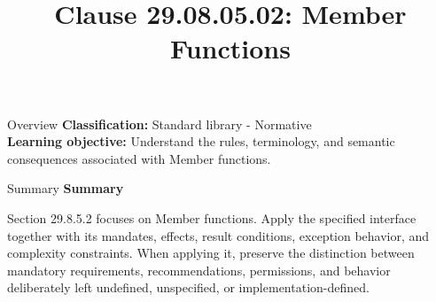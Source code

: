 \documentclass[10pt,letterpaper]{article}
\title{Clause 29.08.05.02: Member Functions}
\author{}
\date{}
\begin{document}
\maketitle
\begin{CornellOverviewBox}{Overview}
\textbf{Classification:} Standard library - Normative\\[2pt]
\textbf{Learning objective:} Understand the rules, terminology, and semantic consequences associated with Member functions.
\end{CornellOverviewBox}\begin{CornellSummaryBox}{Summary}
{\sffamily\bfseries\color{Accent} Summary}\par\vspace{3pt}Section 29.8.5.2 focuses on Member functions. Apply the specified interface together with its mandates, effects, result conditions, exception behavior, and complexity constraints. When applying it, preserve the distinction between mandatory requirements, recommendations, permissions, and behavior deliberately left undefined, unspecified, or implementation-defined.
\end{CornellSummaryBox}
\end{document}
